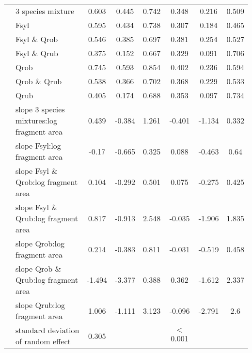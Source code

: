 \documentclass[10pt, twoside]{book} %
\begin{document}
\begin{landscape}
\begin{table}
\begin{center}
\begin{footnotesize}
\begin{tabular}{c l c c c c c c}
					 & 3 species mixture & 0.603 & 0.445 & 0.742 & 0.348 & 0.216 & 0.509\\
					& Fsyl & 0.595 & 0.434 & 0.738 & 0.307 & 0.184 & 0.465\\
					& Fsyl \& Qrob & 0.546 & 0.385 & 0.697 & 0.381 & 0.254 & 0.527\\
					& Fsyl \& Qrub & 0.375 & 0.152 & 0.667 & 0.329 & 0.091 & 0.706\\
					& Qrob & 0.745 & 0.593 & 0.854 & 0.402 & 0.236 & 0.594\\
					& Qrob \& Qrub & 0.538 & 0.366 & 0.702 & 0.368 & 0.229 & 0.533\\
					& Qrub & 0.405 & 0.174 & 0.688 & 0.353 & 0.097 & 0.734\\
					\cline{2-8}
					\multirow{7}{*}{\rotatebox[origin=c]{90}{\parbox[c]{3cm}{\centering Slopes)}}} & slope 3 species mixtures:log fragment area & 0.439 & -0.384 & 1.261 & -0.401 & -1.134 & 0.332\\
					& slope Fsyl:log fragment area & -0.17 & -0.665 & 0.325 & 0.088 & -0.463 & 0.64\\
					& slope Fsyl \& Qrob:log fragment area & 0.104 & -0.292 & 0.501 & 0.075 & -0.275 & 0.425\\
					& slope Fsyl \& Qrub:log fragment area & 0.817 & -0.913 & 2.548 & -0.035 & -1.906 & 1.835\\
					& slope Qrob:log fragment area & 0.214 & -0.383 & 0.811 & -0.031 & -0.519 & 0.458\\
					& slope Qrob \& Qrub:log fragment area & -1.494 & -3.377 & 0.388 & 0.362 & -1.612 & 2.337\\
					& slope Qrub:log fragment area & 1.006 & -1.111 & 3.123 & -0.096 & -2.791 & 2.6\\
					\cline{2-8}
					
					& standard deviation of random effect& 	0.305&&&$<$ 0.001&&\\	
					\bottomrule
				\end{tabular}\endgroup
			\end{footnotesize}
		\end{center}
	\end{table}
	\end{landscape}
	\clearpage
	
\end{document}
